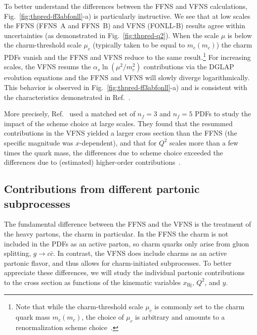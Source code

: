 \documentclass[pdftex,twocolumn,epjc3]{svjour3}          %
\newcommand{\xbj}{\ensuremath{x_{\text{Bj}}}\xspace}
\newcommand{\fonll} {{FONLL-B}\xspace}
\newcommand{\ffns} {{FFNS~A}\xspace}
\newcommand{\ffnsb} {{FFNS~B}\xspace}
\begin{document}
%
To better understand the differences between the FFNS and VFNS
calculations, Fig.~\ref{fig:thpred-ff3abfonll}-a) is particularly
instructive.
%
We see that at low scales the FFNS (\ffns and \ffnsb) and VFNS
(\fonll) results agree within uncertainties (as demonstrated in 
Fig.~\ref{fig:thpred-q2}). When the scale $\mu$ is
below the charm-threshold scale $\mu_c$ (typically taken to be equal
to $m_c(m_c)$) the charm PDFs vanish and the FFNS and VFNS reduce to
the same result.\footnote{Note that while the charm-threshold scale
  $\mu_c$ is commonly set to the charm quark mass $m_c(m_c)$, the
  choice of $\mu_c$ is arbitrary and amounts to a renormalization
  scheme choice~\cite{Bertone:2017ehk}.}
%
For increasing scales, the VFNS resums the $\alpha_s\ln(\mu^2/m_c^2)$
contributions via the DGLAP evolution equations and the FFNS and VFNS
will slowly diverge logarithmically. This behavior is observed in
Fig.~\ref{fig:thpred-ff3abfonll}-a) and is consistent with the
characteristics demonstrated in Ref.~\cite{Kusina:2013slm}.

More precisely, Ref.~\cite{Kusina:2013slm} used a matched set of
$n_f=3$ and $n_f=5$ PDFs to study the impact of the scheme choice at
large scales. They found that the resummed contributions in the VFNS
yielded a larger cross section than the FFNS (the specific magnitude
was $x$-dependent), and that for $Q^2$ scales more than a few times
the quark mass, the differences due to scheme choice exceeded the
differences due to (estimated) higher-order
contributions~\cite{Kusina:2013slm}.
%


\subsection{Contributions from different partonic subprocesses}
\label{sec:thpred-partonic}


The fundamental difference between the FFNS and the VFNS is the
treatment of the heavy partons, the charm in particular. In the FFNS
the charm is not included in the PDFs as an active parton, so charm
quarks only arise from gluon splitting, $g\to c \bar{c}$. In contrast,
the VFNS does include charms as an active partonic flavor, and thus
allows for charm-initiated subprocesses.
%
To better appreciate these differences, we will study the individual
partonic contributions to the cross section as functions of the
kinematic variables \xbj, $Q^2$, and $y$.
\end{document}
